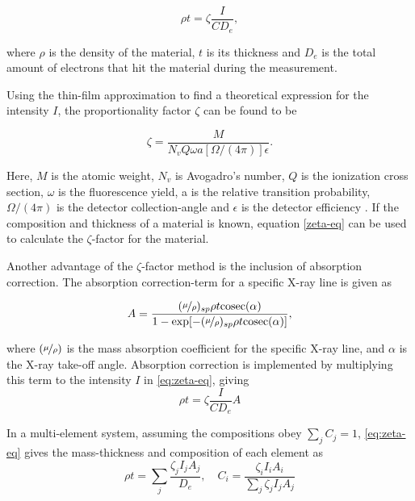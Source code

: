 \begin{equation}
\label{eq:zeta-eq}
\rho t = \zeta \frac{I}{C D_e},
\end{equation}

where $\rho$ is the density of the material, $t$ is its thickness and $D_e$ is the total amount of electrons that hit the material during the measurement. 

Using the thin-film approximation to find a theoretical expression for the intensity $I$, the proportionality factor $\zeta$ can be found to be

\begin{equation}
\label{eq:zeta= }
\zeta = \dfrac{M}{N_v Q \omega a [\Omega/(4\pi)]\epsilon}.
\end{equation}

Here, $M$ is the atomic weight, $N_v$ is Avogadro's number, $Q$ is the ionization cross section, $\omega$ is the fluorescence yield, a is the relative transition probability, $\Omega/(4\pi)$ is the detector collection-angle and $\epsilon$ is the detector efficiency \cite{zeta-method}. If the composition and thickness of a material is known, equation \eqref{zeta-eq} can be used to calculate the $\zeta$-factor for the material.

Another advantage of the $\zeta$-factor method is the inclusion of absorption correction. The absorption correction-term for a specific X-ray line is given as

\begin{equation}
A = \frac{(\nicefrac{\mu}{\rho})_{sp} \rho t \mathrm{cosec} (\alpha)}{1-\exp[-(\nicefrac{\mu}{\rho})_{sp}\rho t \mathrm{cosec} (\alpha)]},
\label{eq:Abs-corr}
\end{equation}

where $(\nicefrac{\mu}{\rho})$ is the mass absorption coefficient for the specific X-ray line, and $\alpha$ is the X-ray take-off angle. Absorption correction is implemented by multiplying this term to the intensity $I$ in \cref{eq:zeta-eq}, giving 
\begin{equation}
\rho t = \zeta \frac{I}{C D_e} A
\end{equation}

In a multi-element system, assuming the compositions obey $\sum_{j} C_j = 1$, \cref{eq:zeta-eq} gives the mass-thickness and composition of each element as
\begin{equation}
\rho t = \sum_j \frac{\zeta_j I_j A_j}{D_e}, \quad C_i = \frac{\zeta_i I_i A_i}{\sum_j \zeta_j I_j A_j}
\end{equation}

